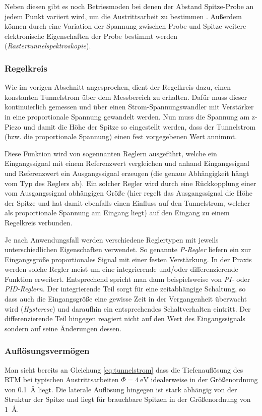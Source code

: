 \documentclass[10pt, a4paper]{article}
\begin{document}
Neben diesen gibt es noch Betriesmoden bei denen der Abstand Spitze-Probe an jedem Punkt variiert wird, um die Austrittsarbeit zu bestimmen \cite{sakai}.
Außerdem können durch eine Variation der Spannung zwischen Probe und Spitze weitere elektronische Eigenschaften der Probe bestimmt werden (\emph{Rastertunnelspektroskopie}).

\subsubsection{Regelkreis}
\label{sssec:Regelkreis}
Wie im vorigen Abschnitt angesprochen, dient der Regelkreis dazu, einen konstanten Tunnelstrom über dem Messbereich zu erhalten.
Dafür muss dieser kontinuierlich gemessen und über einen Strom-Spannungswandler mit Verstärker in eine proportionale Spannung gewandelt werden.
Nun muss die Spannung am z-Piezo und damit die Höhe der Spitze so eingestellt werden, dass der Tunnelstrom (bzw. die proportionale Spannung) einen fest vorgegebenen Wert annimmt.

Diese Funktion wird von sogennanten Reglern ausgeführt, welche ein Eingangssignal mit einem Referenzwert vergleichen und anhand Eingangssignal und Referenzwert ein Ausgangssignal erzeugen (die genaue Abhängigkeit hängt vom Typ des Reglers ab).
Ein solcher Regler wird durch eine Rückkopplung einer vom Ausgangssignal abhängigen Größe (hier regelt das Ausgangssignal die Höhe der Spitze und hat damit ebenfalls einen Einfluss auf den Tunnelstrom, welcher als proportionale Spannung am Eingang liegt) auf den Eingang zu einem Regelkreis verbunden.

Je nach Anwendungsfall werden verschiedene Reglertypen mit jeweils unterschiedlichen Eigenschaften verwendet.
So genannte \emph{P-Regler} liefern ein zur Eingangsgröße proportionales Signal mit einer festen Verstärkung.
In der Praxis werden solche Regler meist um eine integrierende und/oder differenzierende Funktion erweitert. Entsprechend spricht man dann beispielsweise von \emph{PI-} oder \emph{PID-Reglern}.
Der integrierende Teil sorgt für eine zeitabhängige Schaltung, so dass auch die Eingangsgröße eine gewisse Zeit in der Vergangenheit überwacht wird (\emph{Hysterese}) und daraufhin ein entsprechendes Schaltverhalten eintritt.
Der differenzierende Teil hingegen reagiert nicht auf den Wert des Eingangssignals sondern auf seine Änderungen dessen.

\subsubsection{Auflösungsvermögen}
Man sieht bereits an Gleichung \ref{eq:tunnelstrom} dass die Tiefenauflösung des RTM bei typischen Austrittsarbeiten $\Phi = \SI{4}{\electronvolt}$ idealerweise in der Größenordnung von \SI{0,1}{\angstrom} liegt.
Die laterale Auflösung hingegen ist stark abhängig von der Struktur der Spitze und liegt für brauchbare Spitzen in der Größenordnung von \SI{1}{\angstrom}.
\end{document}
